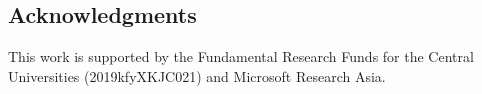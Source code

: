 \documentclass[10pt,twocolumn,letterpaper]{article}
\begin{document}
\vspace{-0.5em}    
\subsection*{Acknowledgments}
This work is supported by the Fundamental Research Funds for the Central Universities (2019kfyXKJC021) and Microsoft Research Asia.

{\small
    
    
}
    
\end{document}
